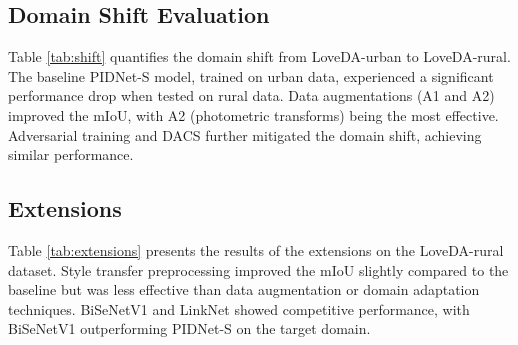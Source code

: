 \documentclass{article}
\begin{document}
\begin{multicols}{2}
		
		
		

		
		\subsection{Domain Shift Evaluation}
		\small
		Table \ref{tab:shift} quantifies the domain shift from LoveDA-urban to LoveDA-rural. The baseline PIDNet-S model, trained on urban data, experienced a significant performance drop when tested on rural data. Data augmentations (A1 and A2) improved the mIoU, with A2 (photometric transforms) being the most effective. Adversarial training and DACS further mitigated the domain shift, achieving similar performance.
		\begin{center}

			\label{tab:shift}
		

		\end{center} 

		
		\subsection{Extensions}
		\justifying
		Table \ref{tab:extensions} presents the results of the extensions on the LoveDA-rural dataset. Style transfer preprocessing improved the mIoU slightly compared to the baseline but was less effective than data augmentation or domain adaptation techniques. BiSeNetV1 and LinkNet showed competitive performance, with BiSeNetV1 outperforming PIDNet-S on the target domain.
		\begin{center}


\end{center}
\end{multicols}
\end{document}
